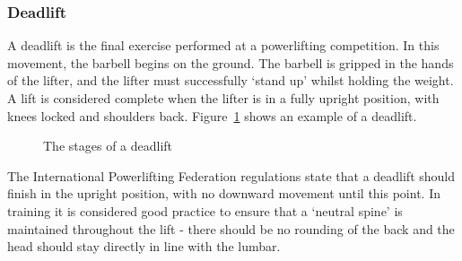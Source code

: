 \subsubsection{Deadlift}

A deadlift is the final exercise performed at a powerlifting competition. In this movement, the barbell begins on the ground. The barbell is gripped in the hands of the lifter, and the lifter must successfully `stand up' whilst holding the weight. A lift is considered complete when the lifter is in a fully upright position, with knees locked and shoulders back. Figure~\ref{fig:dead_stages} shows an example of a deadlift.

\begin{figure}[H]
    \centering
\caption{The stages of a deadlift}
\label{fig:dead_stages}
\end{figure}

The International Powerlifting Federation regulations\cite{ipf} state that a deadlift should finish in the upright position, with no downward movement until this point. In training it is considered good practice to ensure that a `neutral spine' is maintained throughout the lift - there should be no rounding of the back and the head should stay directly in line with the lumbar.